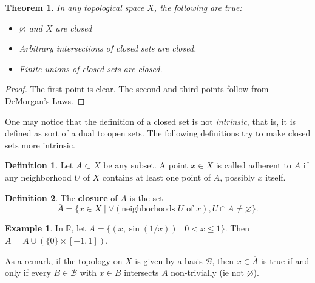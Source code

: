 \documentclass[12pt]{article}
\theoremstyle{plain}
\newtheorem{theorem}{Theorem}
\theoremstyle{definition}
\newtheorem{definition}{Definition}
\newtheorem{example}{Example}
\begin{document}
\begin{theorem}
In any topological space $X$, the following are true:
\begin{itemize}
	\item $\varnothing$ and $X$ are closed
	\item Arbitrary intersections of closed sets are closed.
	\item Finite unions of closed sets are closed.
\end{itemize}
\end{theorem}
\begin{proof}
The first point is clear. The second and third points follow from DeMorgan's Laws.
\end{proof}

One may notice that the definition of a closed set is not \textit{intrinsic}, that is, it is defined as sort of a dual to open sets. The following definitions try to make closed sets more intrinsic.

\begin{definition}
	Let $A \subset X$ be any subset. A point $x \in X$ is called adherent to $A$ if any neighborhood $U$ of $X$ contains at least one point of $A$, possibly $x$ itself.
\end{definition}
\begin{definition}
The \textbf{closure} of $A$ is the set 
\[\overline{A} = \{x \in X \mid \forall (\text{neighborhoods $U$ of $x$}), U \cap A \neq \varnothing\}.\]
\end{definition}

\begin{example}
In $\mathbb{R}$, let $A = \{(x, \sin(1/x)) \mid 0 < x \leq 1\}$. Then $\overline{A} = A \cup (\{0\} \times [-1, 1])$.
\end{example}

As a remark, if the topology on $X$ is given by a basis $\mathcal{B}$, then $x \in \overline{A}$ is true if and only if every $B \in \mathcal{B}$ with $x \in B$ intersects $A$ non-trivially (ie not $\varnothing$).
\end{document}
